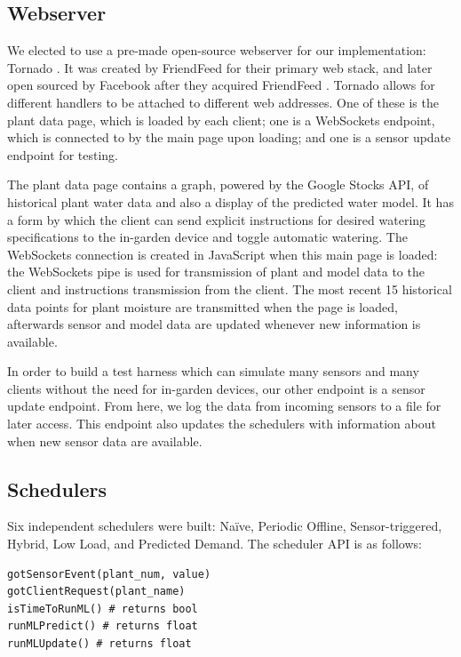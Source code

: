\documentclass[a4paper]{acm_proc_article-sp}
\makeatletter
\newcommand{\Naive}{Na\"{i}ve\@\xspace}
\makeatother
\begin{document}
\subsection{Webserver}

We elected to use a pre-made open-source webserver for our implementation: Tornado \cite{Tornado}.  It was created by FriendFeed for their primary web stack, and later open sourced by Facebook after they acquired FriendFeed \cite{TornadoAnnounce}.  Tornado allows for different handlers to be attached to different web addresses.  One of these is the plant data page, which is loaded by each client; one is a WebSockets endpoint, which is connected to by the main page upon loading; and one is a sensor update endpoint for testing.

The plant data page contains a graph, powered by the Google Stocks API, of historical plant water data and also a display of the predicted water model.  It has a form by which the client can send explicit instructions for desired watering specifications to the in-garden device and toggle automatic watering.  The WebSockets connection is created in JavaScript when this main page is loaded: the WebSockets pipe is used for transmission of plant and model data to the client and instructions transmission from the client.  The most recent 15 historical data points for plant moisture are transmitted when the page is loaded, afterwards sensor and model data are updated whenever new information is available.

In order to build a test harness which can simulate many sensors and many clients without the need for in-garden devices, our other endpoint is a sensor update endpoint.  From here, we log the data from incoming sensors to a file for later access.  This endpoint also updates the schedulers with information about when new sensor data are available.

\subsection{Schedulers}

Six independent schedulers were built: \Naive, Periodic Offline, Sensor-triggered, Hybrid, Low Load, and Predicted Demand.  The scheduler API is as follows:

\begin{lstlisting}
gotSensorEvent(plant_num, value)
gotClientRequest(plant_name)
isTimeToRunML() # returns bool
runMLPredict() # returns float
runMLUpdate() # returns float
\end{lstlisting}
\end{document}

